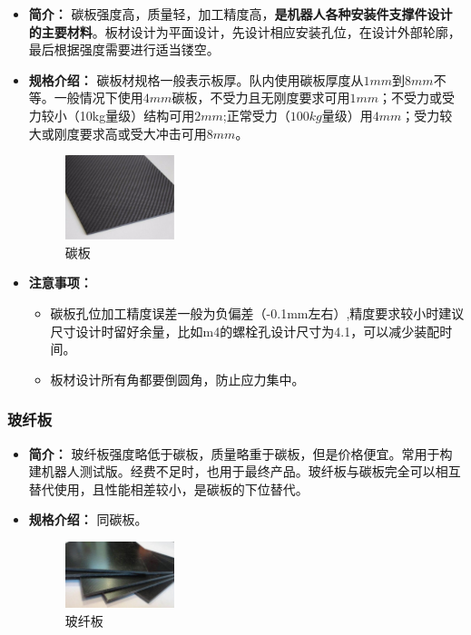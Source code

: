 \documentclass[UTF8]{article} %
\begin{document}
\begin{itemize}
  \item \textbf{简介：} 碳板强度高，质量轻，加工精度高，\textbf{是机器人各种安装件支撑件设计的主要材料}。板材设计为平面设计，先设计相应安装孔位，在设计外部轮廓，最后根据强度需要进行适当镂空。

  \item \textbf{规格介绍：} 碳板材规格一般表示板厚。队内使用碳板厚度从$1mm$到$8mm$不等。一般情况下使用$4mm$碳板，不受力且无刚度要求可用$1mm$；不受力或受力较小（10kg量级）结构可用$2mm$;正常受力（$100kg$量级）用$4mm$；受力较大或刚度要求高或受大冲击可用$8mm$。

  
  \begin{figure}[h]
    \centering
    \includegraphics[width=0.3\textwidth]{ban1.png}
    \caption{碳板}
  \end{figure}

  \item \textbf{注意事项：} 
  
  \begin{itemize}
    \item 碳板孔位加工精度误差一般为负偏差（-0.1mm左右）,精度要求较小时建议尺寸设计时留好余量，比如m4的螺栓孔设计尺寸为4.1，可以减少装配时间。
    \item 板材设计所有角都要倒圆角，防止应力集中。	
  \end{itemize}
  
\end{itemize}

\subsubsection{玻纤板}

\begin{itemize}
  \item \textbf{简介：}   玻纤板强度略低于碳板，质量略重于碳板，但是价格便宜。常用于构建机器人测试版。经费不足时，也用于最终产品。玻纤板与碳板完全可以相互替代使用，且性能相差较小，是碳板的下位替代。

  \item \textbf{规格介绍：} 同碳板。

  \begin{figure}[h]
    \centering
    \includegraphics[width=0.3\textwidth]{ban2.png}
    \caption{玻纤板}
  \end{figure}

\end{itemize}
\end{document}

